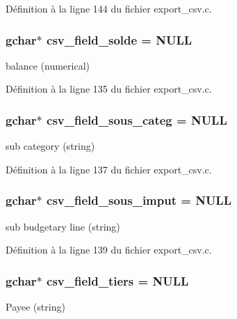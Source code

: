 Définition à la ligne 144 du fichier export\_\-csv.c.

\subsubsection[{csv\_\-field\_\-solde}]{\setlength{\rightskip}{0pt plus 5cm}gchar$\ast$ {\bf csv\_\-field\_\-solde} = NULL}\label{export__csv_8c_ab1e64284cecf7c3475d5208254a61601}
balance (numerical) 

Définition à la ligne 135 du fichier export\_\-csv.c.

\subsubsection[{csv\_\-field\_\-sous\_\-categ}]{\setlength{\rightskip}{0pt plus 5cm}gchar$\ast$ {\bf csv\_\-field\_\-sous\_\-categ} = NULL}\label{export__csv_8c_a53faf2196702be6f1b599ce8ed2f8450}
sub category (string) 

Définition à la ligne 137 du fichier export\_\-csv.c.

\subsubsection[{csv\_\-field\_\-sous\_\-imput}]{\setlength{\rightskip}{0pt plus 5cm}gchar$\ast$ {\bf csv\_\-field\_\-sous\_\-imput} = NULL}\label{export__csv_8c_a12d3e2549985ee72b27ff3957a0a7e4e}
sub budgetary line (string) 

Définition à la ligne 139 du fichier export\_\-csv.c.

\subsubsection[{csv\_\-field\_\-tiers}]{\setlength{\rightskip}{0pt plus 5cm}gchar$\ast$ {\bf csv\_\-field\_\-tiers} = NULL}\label{export__csv_8c_a6545db890bf887b484058fe570e0efca}
Payee (string) 

